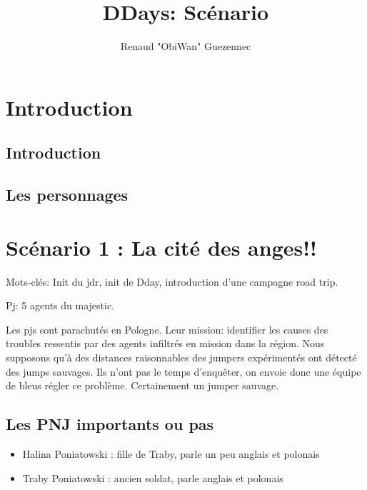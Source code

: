 \documentclass[oneside,12pt]{book}
\title{DDays: Scénario}
\author{Renaud "ObiWan" Guezennec}
\date{}
\begin{document}
\maketitle \clearpage
\tableofcontents \clearpage

\begin{flushleft}
    \chapter{Introduction}
        \section{Introduction}
        \section{Les personnages}
        
      


\clearpage









\chapter{Scénario 1 : La cité des anges!!}

Mots-clés: Init du jdr, init de Dday, introduction d’une campagne road trip.

Pj: 5 agents du majestic.

Les pjs sont parachutés en Pologne. 
Leur mission: identifier les causes des troubles ressentis par des agents infiltrés en mission dans la région. 
Nous supposons qu’à des distances raisonnables des jumpers expérimentés ont détecté des jumps sauvages. 
Ils n’ont pas le temps d’enquêter, on envoie donc une équipe de bleus régler ce problème. 
Certainement un jumper sauvage. 
\section{Les PNJ importants ou pas}
\begin{itemize}
\item Halina Poniatowski : fille de Traby, parle un peu anglais et polonais
\item Traby Poniatowski : ancien soldat, parle anglais et polonais
\end{itemize}



\end{flushleft}
\end{document}
